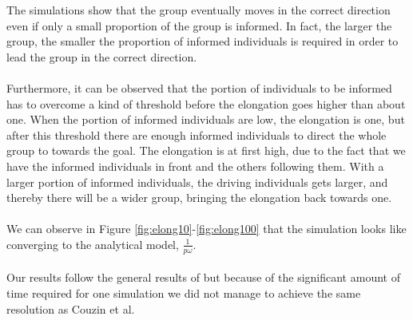 The simulations show that the group eventually moves in the correct direction even if only a small proportion of the group is informed. 
In fact, the larger the group, the smaller the proportion of informed individuals is required in order to lead the group in the correct direction.
\\\\
Furthermore, it can be observed that the portion of individuals to be informed has to overcome a kind of threshold before the elongation goes higher than about one. 
When the portion of informed individuals are low, the elongation is one, but after this threshold there are enough informed individuals to direct the whole group to towards the goal. 
The elongation is at first high, due to the fact that we have the informed individuals in front and the others following them. 
With a larger portion of informed individuals, the driving individuals gets larger, and thereby there will be a wider group, bringing the elongation back towards one.
\\\\
We can observe in Figure \ref{fig:elong10}-\ref{fig:elong100} that the simulation looks like converging to the analytical model, $\frac{1}{p\omega}$.
\\\\
Our results follow the general results of \cite{theArticle} but because of the significant amount of time required for one simulation we did not manage to achieve the same resolution as Couzin et al.